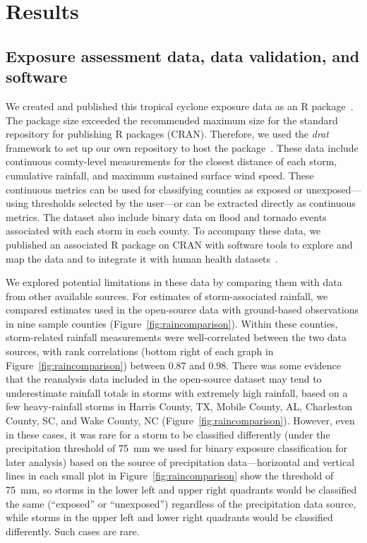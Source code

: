 \section*{Results}

\subsection*{Exposure assessment data, data validation, and software}

We created and published this tropical cyclone exposure data as an R
package~\parencite{hurricaneexposuredata}.  The package size exceeded the
recommended maximum size for the standard repository for publishing R packages
(\ac{CRAN}). Therefore, we used the \textit{drat} framework to set up our own
repository to host the package~\parencite{anderson2017hosting}. These data
include continuous county-level measurements for the closest distance of each
storm, cumulative rainfall, and maximum sustained surface wind speed. These
continuous metrics can be used for classifying counties as exposed or
unexposed---using thresholds selected by the user---or can be extracted
directly as continuous metrics. The dataset also include binary data on flood
and tornado events associated with each storm in each county. To accompany
these data, we published an associated R package on \ac{CRAN} with software
tools to explore and map the data and to integrate it with human health
datasets~\parencite{hurricaneexposure}.

We explored potential limitations in these data by comparing them with data
from other available sources.  For estimates of storm-associated rainfall, we
compared estimates used in the open-source data with ground-based observations
in nine sample counties (Figure~\ref{fig:raincomparison}). Within these
counties, storm-related rainfall measurements were well-correlated between the
two data sources, with rank correlations (bottom right of each graph in
Figure~\ref{fig:raincomparison}) between 0.87 and 0.98. There was some evidence
that the reanalysis data included in the open-source dataset may tend to
underestimate rainfall totals in storms with extremely high rainfall, based on
a few heavy-rainfall storms in Harris County, TX, Mobile County, AL, Charleston
County, SC, and Wake County, NC (Figure~\ref{fig:raincomparison}). However,
even in these cases, it was rare for a storm to be classified differently
(under the precipitation threshold of 75~\si{\milli\metre} we used for binary
exposure classification for later analysis) based on the source of
precipitation data---horizontal and vertical lines in each small plot in
Figure~\ref{fig:raincomparison} show the threshold of 75~\si{\milli\metre}, so
storms in the lower left and upper right quadrants would be classified the same
(``exposed'' or ``unexposed'') regardless of the precipitation data source,
while storms in the upper left and lower right quadrants would be classified
differently. Such cases are rare.

